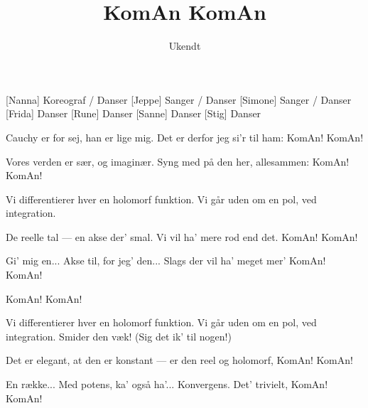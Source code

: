 \documentclass[a4paper,11pt]{article}
\title{KomAn KomAn}
\author{Ukendt}
\begin{document}
\maketitle

\begin{roles}
[Nanna] Koreograf / Danser
[Jeppe] Sanger / Danser
[Simone] Sanger / Danser
[Frida] Danser
[Rune] Danser
[Sanne] Danser
[Stig] Danser
\end{roles}

\begin{song}
 Cauchy er for sej,
han er lige mig.    
Det er derfor jeg si'r til ham:
KomAn! KomAn!

Vores verden er sær,
og imaginær.
Syng med på den her, allesammen:
KomAn! KomAn!

Vi differentierer hver en holomorf funktion.
Vi går uden om en pol, ved integration.      

De reelle tal 
--- en akse der' smal.
Vi vil ha' mere rod end det.
KomAn! KomAn!  

Gi' mig en... Akse til,
for jeg' den... Slags der vil
ha' meget mer'
KomAn! KomAn!   

KomAn! KomAn!

Vi differentierer hver en holomorf funktion.
Vi går uden om en pol, ved integration.
Smider den væk! (Sig det ik' til nogen!) 

Det er elegant, 
at den er konstant
--- er den reel og holomorf,
KomAn! KomAn!

En række... Med potens,
ka' også ha'... Konvergens.
Det' trivielt,
KomAn! KomAn! 
\end{song}
\end{document}
